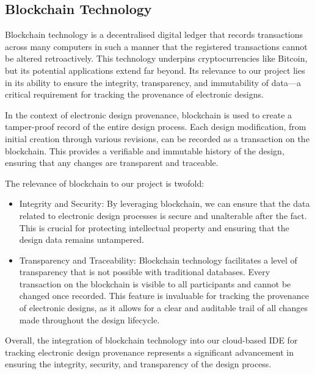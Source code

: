 \documentclass{tufte-handout}
\begin{document}
\subsection{Blockchain Technology}
Blockchain technology is a decentralised digital ledger that records transactions across many computers in such a manner that the registered transactions cannot
be altered retroactively. This technology underpins cryptocurrencies like Bitcoin, but its potential applications extend far beyond. Its relevance to our project
lies in its ability to ensure the integrity, transparency, and immutability of data—a critical requirement for tracking the provenance of electronic designs.

In the context of electronic design provenance, blockchain is used to create a tamper-proof record of the entire design process. Each design modification,
from initial creation through various revisions, can be recorded as a transaction on the blockchain. This provides a verifiable and immutable history of the design,
ensuring that any changes are transparent and traceable.

The relevance of blockchain to our project is twofold:
\begin{itemize}
    \item Integrity and Security: By leveraging blockchain, we can ensure that the data related to electronic design processes is secure and unalterable after the fact.
This is crucial for protecting intellectual property and ensuring that the design data remains untampered.
    \item Transparency and Traceability: Blockchain technology facilitates a level of transparency that is not possible with traditional databases. Every transaction
on the blockchain is visible to all participants and cannot be changed once recorded. This feature is invaluable for tracking the provenance of electronic designs,
as it allows for a clear and auditable trail of all changes made throughout the design lifecycle.
\end{itemize}
Overall, the integration of blockchain technology into our cloud-based IDE for tracking electronic design provenance represents a significant advancement in
ensuring the integrity, security, and transparency of the design process.
\end{document}
